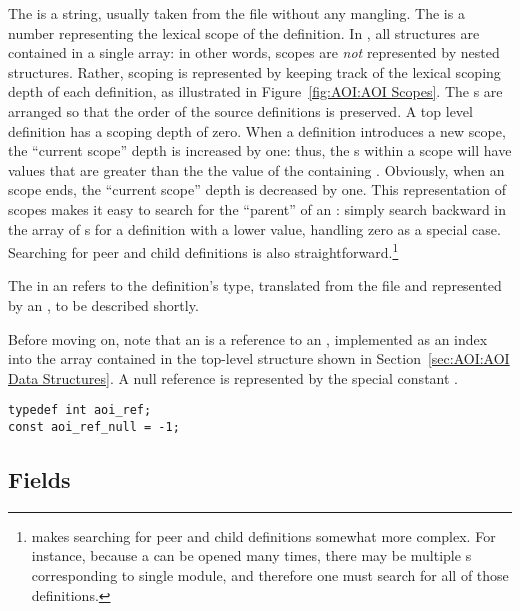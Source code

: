 The  is a string, usually taken from the \IDL{} file without any
mangling.
%
The  is a number representing the lexical scope of the definition.
In \AOI{}, all  structures are contained in a single array: in
other words, scopes are \emph{not} represented by nested 
structures.  Rather, scoping is represented by keeping track of the lexical
scoping depth of each definition, as illustrated in Figure~\ref{fig:AOI:AOI
Scopes}.  The s are arranged so that the order of the \IDL{}
source definitions is preserved.  A top level \IDL{} definition has a scoping
depth of zero.  When a definition introduces a new scope, the \AOI{} ``current
scope'' depth is increased by one: thus, the s within a scope will
have  values that are greater than the the  value of the
containing .  Obviously, when an \IDL{} scope ends, the \AOI{}
``current scope'' depth is decreased by one.  This representation of scopes
makes it easy to search for the ``parent'' of an : simply search
backward in the array of s for a definition with a lower
 value, handling zero as a special case.  Searching for peer and
child definitions is also straightforward.\footnote{\CORBA{} \IDL{} makes
searching for peer and child definitions somewhat more complex.  For instance,
because a  can be opened many times, there may be multiple
s corresponding to single module, and therefore one must search
for all of those definitions.}

The  in an  refers to the definition's type,
translated from the \IDL{} file and represented by an , to be
described shortly.

Before moving on, note that an  is a reference to an
, implemented as an index into the  array contained
in the top-level  structure shown in Section~\ref{sec:AOI:AOI Data
Structures}.  A null reference is represented by the special constant
.

\begin{verbatim}
typedef int aoi_ref;
const aoi_ref_null = -1;
\end{verbatim}



\subsection{Fields}
\label{subsec:AOI:Fields}

